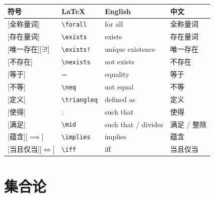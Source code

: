 \documentclass[11pt]{ctexart}
\DeclareRobustCommand{\idxexistsunique}{\ensuremath{\exists!}}
\DeclareRobustCommand{\idximplies}{\ensuremath{\implies}}
\DeclareRobustCommand{\idxiff}{\ensuremath{\iff}}
\begin{document}
\begin{longtable}{>{\centering\arraybackslash}m{2cm} m{3.5cm} m{4.5cm} m{4cm}}
\toprule
符号 & LaTeX & English & 中文 \\
\midrule
\syms{$\forall$}{\verb|\forall|}[全称量词] & \verb|\forall| & for all & 全称量词 \\
\syms{$\exists$}{\verb|\exists|}[存在量词] & \verb|\exists| & exists & 存在量词 \\
\syms{$\exists!$}{\verb|\exists!|}[唯一存在][\idxexistsunique] & \verb|\exists!| & unique existence & 唯一存在 \\
\syms{$\nexists$}{\verb|\nexists|}[不存在] & \verb|\nexists| & not exists & 不存在 \\
\syms{$=$}{=}[等于] & = & equality & 等于 \\
\syms{$\neq$}{\verb|\neq|}[不等] & \verb|\neq| & not equal & 不等 \\
\syms{$\triangleq$}{\verb|\triangleq|}[定义] & \verb|\triangleq| & defined as & 定义 \\
\syms{$:$}{:}[使得] & : & such that & 使得 \\
\syms{$\mid$}{\verb|\mid|}[满足] & \verb|\mid| & such that / divides & 满足 / 整除 \\
\syms{$\implies$}{\verb|\implies|}[蕴含][\idximplies] & \verb|\implies| & implies & 蕴含 \\
\syms{$\iff$}{\verb|\iff|}[当且仅当][\idxiff] & \verb|\iff| & iff & 当且仅当 \\
\bottomrule
\end{longtable}

\section{集合论}\label{sec:sets}
\end{document}
